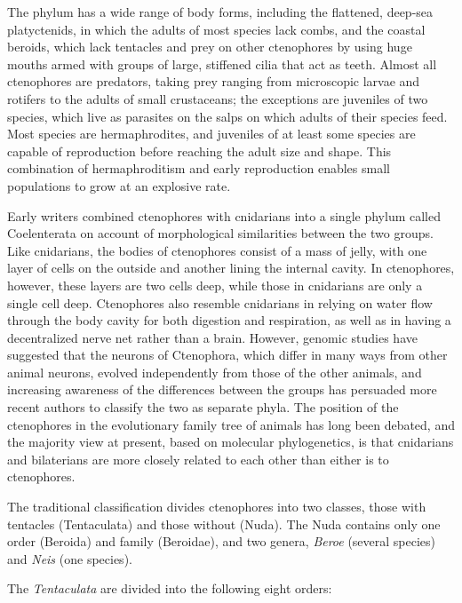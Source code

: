 The phylum has a wide range of body forms, including the flattened,
deep-sea platyctenids, in which the adults of most species lack combs,
and the coastal beroids, which lack tentacles and prey on other
ctenophores by using huge mouths armed with groups of large, stiffened
cilia that act as teeth. Almost all ctenophores are predators, taking
prey ranging from microscopic larvae and rotifers to the adults of small
crustaceans; the exceptions are juveniles of two species, which live as
parasites on the salps on which adults of their species feed. Most
species are hermaphrodites, and juveniles of at least some species are
capable of reproduction before reaching the adult size and shape. This
combination of hermaphroditism and early reproduction enables small
populations to grow at an explosive rate.

Early writers combined ctenophores with cnidarians into a single phylum
called Coelenterata on account of morphological similarities between the
two groups. Like cnidarians, the bodies of ctenophores consist of a mass
of jelly, with one layer of cells on the outside and another lining the
internal cavity. In ctenophores, however, these layers are two cells
deep, while those in cnidarians are only a single cell deep. Ctenophores
also resemble cnidarians in relying on water flow through the body
cavity for both digestion and respiration, as well as in having a
decentralized nerve net rather than a brain. However, genomic studies
have suggested that the neurons of Ctenophora, which differ in many ways
from other animal neurons, evolved independently from those of the other
animals, and increasing awareness of the differences between the groups
has persuaded more recent authors to classify the two as separate phyla.
The position of the ctenophores in the evolutionary family tree of
animals has long been debated, and the majority view at present, based
on molecular phylogenetics, is that cnidarians and bilaterians are more
closely related to each other than either is to ctenophores.

The traditional classification divides ctenophores into two classes,
those with tentacles (Tentaculata) and those without (Nuda). The Nuda
contains only one order (Beroida) and family (Beroidae), and two genera,
\emph{Beroe} (several species) and \emph{Neis} (one species).

The \emph{Tentaculata} are divided into the following eight orders:

